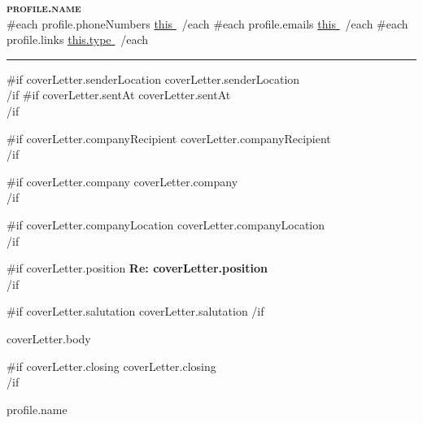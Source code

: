 \documentclass[a4paper,11pt]{letter}
\begin{document}
\begin{center}
  \textbf{\Huge\scshape {{profile.name}} } \\ \vspace{1pt}
  {{#each profile.phoneNumbers}} \small{\underline{ {{this}} }}\, {{/each}}
  {{#each profile.emails}} \small{\underline{ {{this}} }}\, {{/each}}
  {{#each profile.links}} \small{\href{ {{this.url}} }{\underline{ {{this.type}} }}}\, {{/each}}
\end{center}

\vspace{10pt}
\rule{\textwidth}{0.4pt}
\vspace{10pt}

\setlength{\lettercontentmargin}{0.4in}
\addtolength{\leftmargin}{\lettercontentmargin}
\addtolength{\rightmargin}{\lettercontentmargin}
\begin{adjustwidth}{}{}

\begin{flushright}
  {{#if coverLetter.senderLocation}}
    {{coverLetter.senderLocation}}\\
  {{/if}}
  {{#if coverLetter.sentAt}}
    \vspace{12pt}
    {{coverLetter.sentAt}}\\
  {{/if}}
\end{flushright}

\vspace{20pt}

{{#if coverLetter.companyRecipient}}
  {{coverLetter.companyRecipient}}\\
{{/if}}

{{#if coverLetter.company}}
  {{coverLetter.company}}\\
{{/if}}

{{#if coverLetter.companyLocation}}
  {{coverLetter.companyLocation}}\\
{{/if}}

\vspace{20pt}
{{#if coverLetter.position}}
  \textbf{Re: {{coverLetter.position}} }\\
{{/if}}

\vspace{20pt}
{{#if coverLetter.salutation}}
  {{coverLetter.salutation}}
{{/if}}

\vspace{12pt}
{{{coverLetter.body}}}

\vspace{20pt}
{{#if coverLetter.closing}}
  {{coverLetter.closing}}\\
{{/if}}

\vspace{12pt}
{{profile.name}}\\

\end{adjustwidth}
\end{document}
